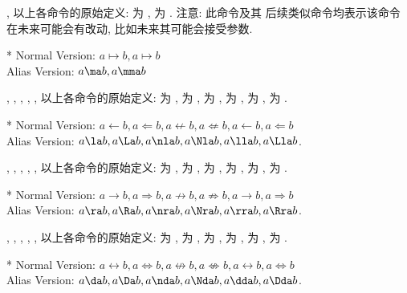 \begin{function}[updated=2024-12-05]{\ma, \mma}
  以上各命令的原始定义: \cmd{\ma} 为 , \cmd{\mma} 为 . 注意: 此命令及其
  后续类似命令均表示该命令在未来可能会有改动, 比如未来其可能会接受参数.
\end{function}
\begin{DocExample}*
Normal Version: $a\mapsto b, a\longmapsto b$ \\
Alias Version: $a\ma b, a\mma b$
\end{DocExample}


\begin{function}[updated=2024-12-05]{\la, \La, \nla, \Nla, \lla, \Lla}
  以上各命令的原始定义: \cmd{\la} 为 , \cmd{\La} 为 , 
  \cmd{\nla} 为 , \cmd{\Nla} 为 , \cmd{\lla} 为 ,
  \cmd{\Lla} 为 .
\end{function}
\begin{DocExample}*
Normal Version: $a\leftarrow b, a\Leftarrow b, a\nleftarrow b, a\nLeftarrow b, a\longleftarrow b, a\Longleftarrow b$ \\
Alias Version: $a\la b, a\La b, a\nla b, a\Nla b, a\lla b, a\Lla b$.
\end{DocExample}

\begin{function}[updated=2024-12-05]{\ra, \Ra, \nra, \Nra, \rra, \Rra}
  以上各命令的原始定义: \cmd{\ra} 为 , \cmd{\Ra} 为 , 
  \cmd{\nra} 为 , \cmd{\Nra} 为 , \cmd{\rra} 为 ,
  \cmd{\Rra} 为 .
\end{function}
\begin{DocExample}*
Normal Version: $a\rightarrow b, a\Rightarrow b, a\nrightarrow b, a\nRightarrow b, a\longrightarrow b, a\Longrightarrow b$ \\
Alias Version: $a\ra b, a\Ra b, a\nra b, a\Nra b, a\rra b, a\Rra b$.
\end{DocExample}

\begin{function}[updated=2024-12-05]{\da, \Da, \nda, \Nda, \dda, \Dda}
  以上各命令的原始定义: \cmd{\da} 为 , \cmd{\Da} 为 , 
  \cmd{\nda} 为 , \cmd{\Nda} 为 , \cmd{\dda} 为 ,
  \cmd{\Dda} 为 .
\end{function}
\begin{DocExample}*
Normal Version: $a\leftrightarrow b, a\Leftrightarrow b, a\nleftrightarrow b, a\nLeftrightarrow b, a\longleftrightarrow b, a\Longleftrightarrow b$ \\
Alias Version: $a\da b, a\Da b, a\nda b, a\Nda b, a\dda b, a\Dda b$.
\end{DocExample}



